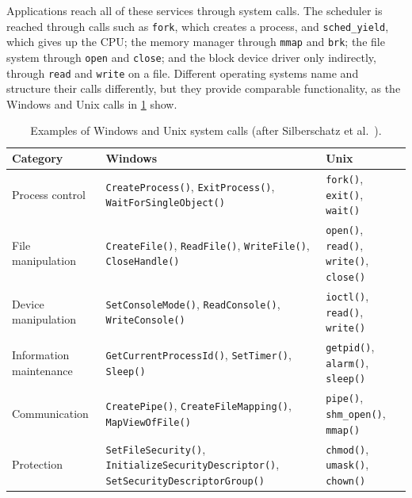 \documentclass[../main.tex]{subfiles}
\begin{document}
Applications reach all of these services through system calls.  The
scheduler is reached through calls such as \texttt{fork}, which creates a
process, and \texttt{sched\_yield}, which gives up the CPU; the memory
manager through \texttt{mmap} and \texttt{brk}; the file system through
\texttt{open} and \texttt{close}; and the block device driver only
indirectly, through \texttt{read} and \texttt{write} on a
file.
Different
operating systems name and structure their calls differently, but they
provide comparable functionality, as the Windows and Unix calls in
\cref{tab:l01-syscalls} show.

\begin{table}[htbp]
  \centering
  \caption{Examples of Windows and Unix system calls
    (after Silberschatz et al.\ \cite{silberschatz2018}).}
  \label{tab:l01-syscalls}
  \small
  \begin{tabular}{@{}>{\raggedright}p{24mm}>{\raggedright}p{55mm}%
      >{\raggedright\arraybackslash}p{32mm}@{}}
    \toprule
    Category & Windows & Unix \\
    \midrule
    Process control
      & \texttt{CreateProcess()}, \texttt{ExitProcess()},
        \texttt{WaitForSingleObject()}
      & \texttt{fork()}, \texttt{exit()}, \texttt{wait()} \\
    \addlinespace
    File manipulation
      & \texttt{CreateFile()}, \texttt{ReadFile()}, \texttt{WriteFile()},
        \texttt{CloseHandle()}
      & \texttt{open()}, \texttt{read()}, \texttt{write()},
        \texttt{close()} \\
    \addlinespace
    Device manipulation
      & \texttt{SetConsoleMode()}, \texttt{ReadConsole()},
        \texttt{WriteConsole()}
      & \texttt{ioctl()}, \texttt{read()}, \texttt{write()} \\
    \addlinespace
    Information maintenance
      & \texttt{GetCurrentProcessId()}, \texttt{SetTimer()},
        \texttt{Sleep()}
      & \texttt{getpid()}, \texttt{alarm()}, \texttt{sleep()} \\
    \addlinespace
    Communication
      & \texttt{CreatePipe()}, \texttt{CreateFileMapping()},
        \texttt{MapViewOfFile()}
      & \texttt{pipe()}, \texttt{shm\_open()}, \texttt{mmap()} \\
    \addlinespace
    Protection
      & \texttt{SetFileSecurity()}, \texttt{InitializeSecurityDescriptor()},
        \texttt{SetSecurityDescriptorGroup()}
      & \texttt{chmod()}, \texttt{umask()}, \texttt{chown()} \\
    \bottomrule
  \end{tabular}
\end{table}
\end{document}

